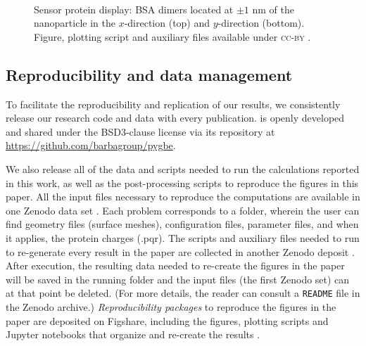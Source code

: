 \begin{figure*}
   \centering
    \\
%
\vspace{-0.5cm}
    \caption{Sensor protein display: BSA dimers located at $\pm 1$ nm of the nanoparticle in the
           $x$-direction (top) and $y$-direction (bottom). Figure, plotting script and auxiliary files available under \textsc{cc-by} \cite{ClementiETal2018e}.}
    \label{fig:display_xy}
\end{figure*}


\subsection{Reproducibility and data management} \label{sec:repro}

To facilitate the reproducibility and replication of our results, 
we consistently release our research code and data with every publication. \pygbe is openly developed and 
shared under the BSD3-clause license via its repository at \url{https://github.com/barbagroup/pygbe}.

We also release all of the data and scripts needed to run the calculations reported in this work, 
as well as the post-processing scripts to reproduce the figures in this paper. 
All the input files necessary to reproduce the computations are available in one Zenodo data set \cite{ClementiETal2018a}. 
Each problem corresponds to a folder, wherein the user can find geometry files (surface meshes), 
configuration files, parameter files, and when it applies, the protein charges (.pqr).
The scripts and auxiliary files needed to run \pygbe to re-generate every result in the paper are collected in another Zenodo deposit \cite{ClementiETal2018b}.
After execution, the resulting data needed to re-create the figures in the paper will be saved in the running folder and the input files (the first Zenodo set) can at that point be deleted.
(For more details, the reader can consult a \texttt{README} file in the Zenodo archive.)
\emph{Reproducibility packages} to reproduce the figures in the paper are deposited on Figshare, 
including the figures, plotting scripts and Jupyter notebooks that organize and re-create the results \cite{ClementiETal2018c,ClementiETal2018d,ClementiETal2018e,ClementiETal2018f}.
